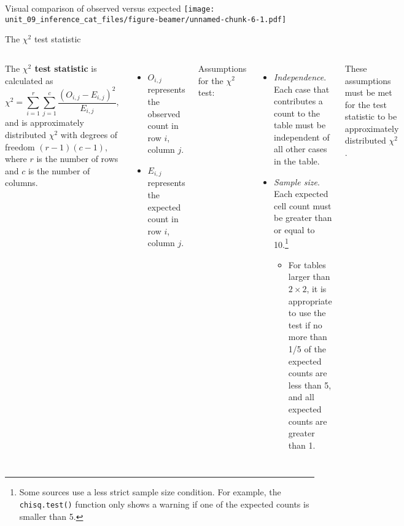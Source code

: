 \documentclass[
  ignorenonframetext,
  aspectratio=169]{beamer}
\newcommand{\columnsbegin}{\begin{columns}}
\newcommand{\columnsend}{\end{columns}}
\begin{document}
\begin{frame}{Visual comparison of observed versus expected}
\protect\hypertarget{visual-comparison-of-observed-versus-expected}{}
\texttt{[image: unit\_09\_inference\_cat\_files/figure-beamer/unnamed-chunk-6-1.pdf]}
\end{frame}

\begin{frame}{The \(\chi^2\) test statistic}
\protect\hypertarget{the-chi2-test-statistic}{}
\columnsbegin


\footnotesize

The \textbf{\(\chi^2\) test statistic} is calculated as
\[\chi^2 = \sum_{i = 1}^r \sum_{j = 1}^c \dfrac{(O_{i, j} - E_{i, j})^2}{E_{i, j}}, \]
and is approximately distributed \(\chi^2\) with degrees of freedom
\((r - 1)(c - 1)\), where \(r\) is the number of rows and \(c\) is the
number of columns.

\begin{itemize}
\item
  \(O_{i, j}\) represents the observed count in row \(i\), column \(j\).
\item
  \(E_{i, j}\) represents the expected count in row \(i\), column \(j\).
\end{itemize}


\footnotesize

Assumptions for the \(\chi^2\) test:

\begin{itemize}
\item
  \emph{Independence}. Each case that contributes a count to the table
  must be independent of all other cases in the table.
\item
  \emph{Sample size}. Each expected cell count must be greater than or
  equal to
  10.\footnote{Some sources use a less strict sample size condition. For example, the \texttt{chisq.test()} function only shows a warning if one of the expected counts is smaller than 5.}

  \begin{itemize}

    \footnotesize

    \item For tables larger than $2 \times 2$, it is appropriate to use the test if no more than 1/5 of the expected counts are less than 5, and all expected counts are greater than 1.

    \end{itemize}
\end{itemize}

These assumptions must be met for the test statistic to be approximately
distributed \(\chi^2\).

\columnsend
\end{frame}
\end{document}
